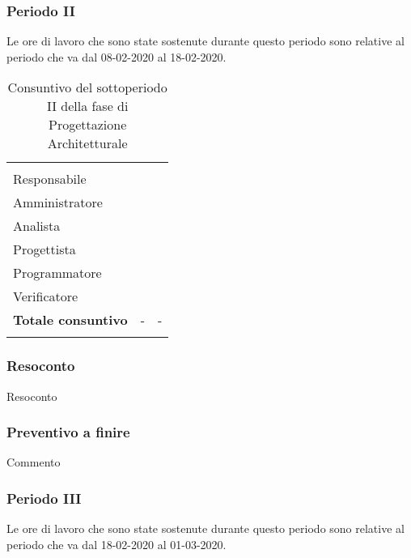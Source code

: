 \subsubsection{Periodo II}

Le ore di lavoro che sono state sostenute durante questo periodo sono relative al periodo che va dal 08-02-2020 al 18-02-2020.

\begin{longtable}{ C{4cm} C{3cm} C{3.5cm}} 
 	 &
 	 &
 	 \\
 	
 	Responsabile &  & \\
 	Amministratore &  & \\
 	Analista & & \\
 	Progettista & & \\
 	Programmatore & &\\
 	Verificatore & & \\
 	
	\hline 	
 	
 	\textbf{Totale consuntivo} &
	- \color{coloreRosso}{\textbf{(+--)}} &
 	- \\	
 	
 	\caption{Consuntivo del sottoperiodo II della fase di Progettazione Architetturale}
\end{longtable}

\vspace{-1cm}

\subsubsection{Resoconto}
Resoconto
\subsubsection{Preventivo a finire}
Commento

\subsubsection{Periodo III}

Le ore di lavoro che sono state sostenute durante questo periodo sono relative al periodo che va dal 18-02-2020 al 01-03-2020.

